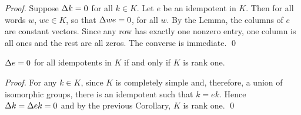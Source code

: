 \begin{proof}     Suppose $\Delta k = 0$ for all $k \in K$.  
Let $e$ be an idempotent in $K$. 
Then for all words $w$,  $we \in K$, so that  $\Delta we = 0$,  for all $w$.  
By the Lemma, the columns of $e$ are constant vectors.  
Since any row has exactly one nonzero entry, one column is all ones and the rest are all zeros.  
The converse is immediate.
\qed
\end{proof}


\begin{corollary}   	\label{cor:5.3}
$\Delta e = 0$ for all idempotents in $K$ if and only if $K$ is rank one.
\end{corollary}


\begin{proof}     For any $k \in K$, since $K$ is completely simple and, therefore, a union of isomorphic groups, there is an idempotent such that  $k = ek$. 
Hence $\Delta k = \Delta ek = 0$ and by the previous Corollary, $K$ is rank one. 
\qed
\end{proof}

